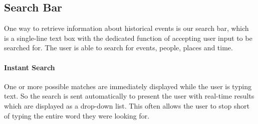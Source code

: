 \subsection{Search Bar}

One way to retrieve information about historical events is our search bar, which is a single-line text box with the dedicated function of accepting user input to be searched for. The user is able to search for events, people, places and time. 



\paragraph{Instant Search} %
\label{par:instant_search}
One or more possible matches are immediately displayed while the user is typing text. So the search is sent automatically to present the user with real-time results which are displayed as a drop-down list. This often allows the user to stop short of typing the entire word they were looking for.